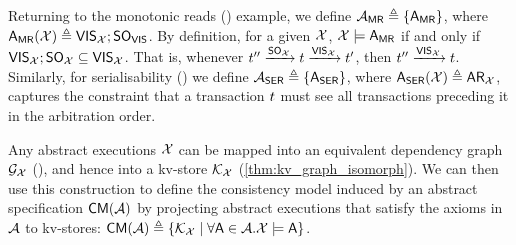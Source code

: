 Returning to the monotonic reads (\MR) example, 
we define $\mathcal{A}_{\mathsf{MR}} \triangleq \{\mathsf{A}_{\mathsf{MR}}\}$, where $\mathsf{A}_{\mathsf{MR}}(\mathcal{X}) \triangleq \mathsf{VIS}_{\mathcal{X}} ; \mathsf{SO}_{\mathsf{VIS}}$. 
By definition, for a given $\mathcal{X}$, $\mathcal{X} \models \mathsf{A}_{\mathsf{MR}}$ if and only 
if $\mathsf{VIS}_{\mathcal{X}} ; \mathsf{SO}_{\mathcal{X}} \subseteq \mathsf{VIS}_{\mathcal{X}}$. 
That is, whenever $t'' \xrightarrow{\mathsf{SO}_{\mathcal{X}}} t \xrightarrow{\mathsf{VIS}_{\mathcal{X}}} t'$, 
then $t'' \xrightarrow{\mathsf{VIS}_{\mathcal{X}}} t$.
Similarly, for serialisability (\SER) we define $\mathcal{A}_{\mathsf{SER}} \triangleq \{ \mathsf{A}_{\mathsf{SER}} \}$, where $\mathsf{A}_{\mathsf{SER}}(\mathcal{X}) \triangleq \mathsf{AR}_{\mathcal{X}}$, 
captures the constraint that a transaction $t$ must see all transactions
preceding it in the arbitration order.

Any abstract executions $\mathcal{X}$ can be mapped 
into an equivalent dependency graph $\mathcal{G}_{\mathcal{X}}$ (\citet{laws}), and hence into a kv-store 
$\mathcal{K}_{\mathcal{X}}$ (\cref{thm:kv_graph_isomorph}). 
We can then use this construction to define the consistency model induced by an abstract specification 
$\CMs(\Ax)$ by projecting abstract executions that satisfy the axioms in $\mathcal{A}$ to kv-stores: 
$\CMs(\Ax) \defeq \{ \hh_{\aexec} \mid \forall \A \in \Ax. \aexec \models \A \}$. 

